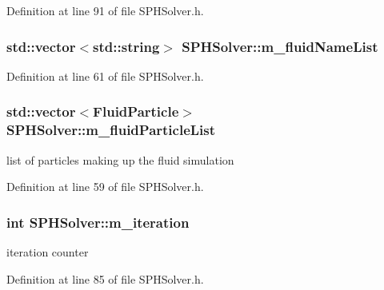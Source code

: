 Definition at line 91 of file SPHSolver.h.

\hypertarget{class_s_p_h_solver_a7eacf79d8d39f885736c50ac8dd81aa2}{
\subsubsection[{m\_\-fluidNameList}]{\setlength{\rightskip}{0pt plus 5cm}std::vector$<$std::string$>$ {\bf SPHSolver::m\_\-fluidNameList}}}
\label{class_s_p_h_solver_a7eacf79d8d39f885736c50ac8dd81aa2}


Definition at line 61 of file SPHSolver.h.

\hypertarget{class_s_p_h_solver_ae158d26d2bb95bdc260e289e6b8c3b0a}{
\subsubsection[{m\_\-fluidParticleList}]{\setlength{\rightskip}{0pt plus 5cm}std::vector$<${\bf FluidParticle}$>$ {\bf SPHSolver::m\_\-fluidParticleList}}}
\label{class_s_p_h_solver_ae158d26d2bb95bdc260e289e6b8c3b0a}


list of particles making up the fluid simulation 



Definition at line 59 of file SPHSolver.h.

\hypertarget{class_s_p_h_solver_ad168b241193a5a34b33553cbd8a26c6f}{
\subsubsection[{m\_\-iteration}]{\setlength{\rightskip}{0pt plus 5cm}int {\bf SPHSolver::m\_\-iteration}}}
\label{class_s_p_h_solver_ad168b241193a5a34b33553cbd8a26c6f}


iteration counter 



Definition at line 85 of file SPHSolver.h.

